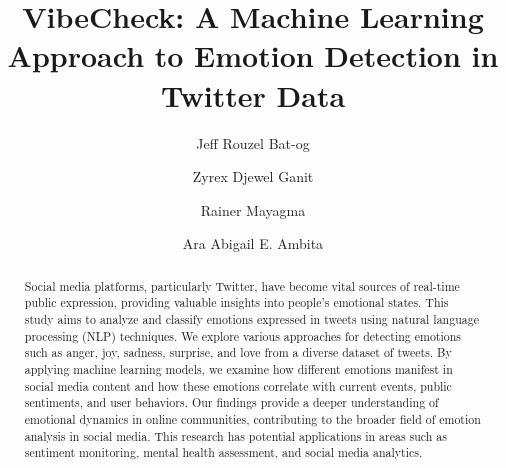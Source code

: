 
\title{VibeCheck: A Machine Learning Approach to Emotion Detection in Twitter Data}
\author{Jeff Rouzel Bat-og \and Zyrex Djewel Ganit \and Rainer Mayagma \and Ara Abigail E. Ambita}

\maketitle


\begin{abstract}
	Social media platforms, particularly Twitter, have become vital sources of real-time public expression, providing valuable insights into people's emotional states. This study aims to analyze and classify emotions expressed in tweets using natural language processing (NLP) techniques. We explore various approaches for detecting emotions such as anger, joy, sadness, surprise, and love from a diverse dataset of tweets. By applying machine learning models, we examine how different emotions manifest in social media content and how these emotions correlate with current events, public sentiments, and user behaviors. Our findings provide a deeper understanding of emotional dynamics in online communities, contributing to the broader field of emotion analysis in social media. This research has potential applications in areas such as sentiment monitoring, mental health assessment, and social media analytics.
\end{abstract}



